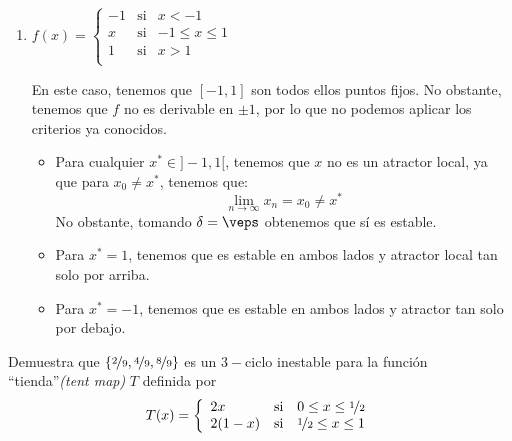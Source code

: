 \begin{ejercicio}
\begin{enumerate}
        \item $f(x)=\left\{\begin{array}{lll}
            -1 & \text{si} & x<-1 \\
            x & \text{si} & -1\leq x\leq 1 \\
            1 & \text{si} & x>1 \\
        \end{array}\right.$

        En este caso, tenemos que $[-1,1]$ son todos ellos puntos fijos. No obstante, tenemos que $f$ no es derivable en $\pm 1$, por lo que no podemos aplicar los criterios ya conocidos.
        \begin{itemize}
            \item  Para cualquier $x^\ast \in ]-1,1[$, tenemos que $x$ no es un atractor local, ya que para $x_0\neq x^\ast$, tenemos que:
            \begin{equation*}
                \lim_{n\to \infty} x_n = x_0\neq x^\ast
            \end{equation*}
            No obstante, tomando $\delta=\veps$ obtenemos que sí es estable.
    
            \item Para $x^\ast=1$, tenemos que es estable en ambos lados y atractor local tan solo por arriba.

            \item Para $x^\ast=-1$, tenemos que es estable en ambos lados y atractor tan solo por debajo.
        \end{itemize}
    \end{enumerate}
\end{ejercicio}



\begin{ejercicio}
    Demuestra que $\left\{\nicefrac{2}{9}, \nicefrac{4}{9}, \nicefrac{8}{9}\right\}$ es un $3-$ciclo inestable para la función ``tienda''\emph{(tent map)} $T$ definida por
    \begin{equation*}
        T(x)=\left\{\begin{array}{lll}
            2x & \text{si} & 0\leq x\leq \nicefrac{1}{2} \\
            2(1-x) & \text{si} & \nicefrac{1}{2} \leq x \leq 1
        \end{array}\right.
    \end{equation*}
\end{ejercicio}

